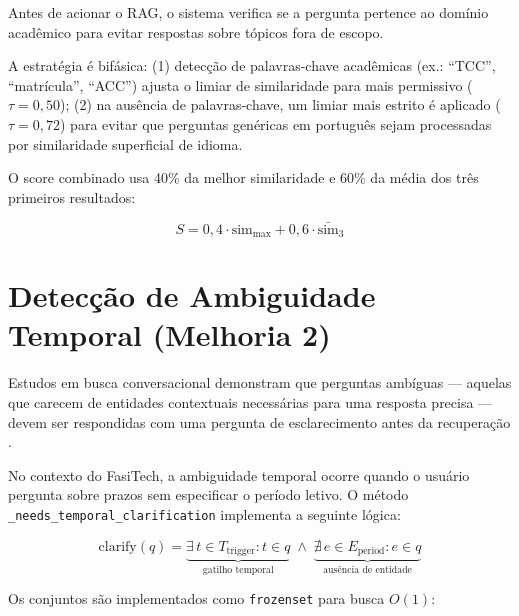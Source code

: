 \documentclass[12pt,a4paper]{report}
\begin{document}
Antes de acionar o RAG, o sistema verifica se a pergunta pertence ao domínio
acadêmico para evitar respostas sobre tópicos fora de escopo.

A estratégia é bifásica: (1) detecção de palavras-chave acadêmicas
(ex.: ``TCC'', ``matrícula'', ``ACC'') ajusta o limiar de similaridade para
mais permissivo ($\tau = 0{,}50$); (2) na ausência de palavras-chave, um
limiar mais estrito é aplicado ($\tau = 0{,}72$) para evitar que perguntas
genéricas em português sejam processadas por similaridade superficial de idioma.

O score combinado usa 40\% da melhor similaridade e 60\% da média dos
três primeiros resultados:

\begin{equation}
  S = 0{,}4 \cdot \text{sim}_{\max} + 0{,}6 \cdot \bar{\text{sim}}_3
\end{equation}

\section{Detecção de Ambiguidade Temporal (Melhoria 2)}
\label{sec:melhoria2}

Estudos em busca conversacional demonstram que perguntas ambíguas — aquelas
que carecem de entidades contextuais necessárias para uma resposta precisa —
devem ser respondidas com uma pergunta de esclarecimento antes da recuperação
\autocite{aliannejadi2021clariq}.

No contexto do FasiTech, a ambiguidade temporal ocorre quando o usuário
pergunta sobre prazos sem especificar o período letivo. O método
\texttt{\_needs\_temporal\_clarification} implementa a seguinte lógica:

\begin{equation}
  \text{clarify}(q) = \underbrace{\exists\, t \in T_{\text{trigger}} : t \in q}_{\text{gatilho temporal}}
  \;\wedge\;
  \underbrace{\nexists\, e \in E_{\text{period}} : e \in q}_{\text{ausência de entidade}}
\end{equation}

Os conjuntos são implementados como \texttt{frozenset} para busca $O(1)$:
\end{document}
